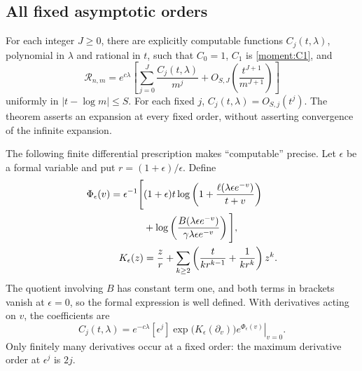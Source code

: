 \subsection{All fixed asymptotic orders}
\begin{theorem}
\label{moment:thm:all-orders}
For each integer $J\ge0$, there are explicitly computable functions
$C_j(t,\lambda)$, polynomial in $\lambda$ and rational in $t$, such that
$C_0=1$, $C_1$ is \eqref{moment:C1}, and
\begin{equation}\label{moment:all-orders}
 \mathcal R_{n,m}=e^{c\lambda}
 \left[\sum_{j=0}^J\frac{C_j(t,\lambda)}{m^j}
 +O_{S,J}\!\left(\frac{t^{J+1}}{m^{J+1}}\right)\right]
\end{equation}
uniformly in $|t-\log m|\le S$. For each fixed $j$,
$C_j(t,\lambda)=O_{S,j}(t^j)$. The theorem asserts an expansion at every
fixed order, without asserting convergence of the infinite expansion.
\end{theorem}

The following finite differential prescription makes ``computable''
precise. Let $\epsilon$ be a formal variable and put
$r=(1+\epsilon)/\epsilon$. Define
\begin{align}\label{moment:formal-Phi}
 \Phi_\epsilon(v)=\epsilon^{-1}\Bigg[
 &(1+\epsilon)t\log\left(1+
 \frac{\ell(\lambda\epsilon e^{-v})}{t+v}\right)\notag\\
 &+\log\left(\frac{B(\lambda\epsilon e^{-v})}
                        {\gamma\lambda\epsilon e^{-v}}\right)\Bigg],\\
 K_\epsilon(z)&=\frac zr+
 \sum_{k\ge2}\left(\frac{t}{kr^{k-1}}+
                         \frac1{kr^k}\right)z^k.
 \label{moment:formal-K}
\end{align}
The quotient involving $B$ has constant term one, and both terms in
brackets vanish at $\epsilon=0$, so the formal expression is well defined.
With derivatives acting on $v$, the coefficients are
\begin{equation}\label{moment:coefficient-algorithm}
 C_j(t,\lambda)=e^{-c\lambda}[\epsilon^j]
 \left.\exp\!\bigl(K_\epsilon(\partial_v)\bigr)
                      e^{\Phi_\epsilon(v)}\right|_{v=0}.
\end{equation}
Only finitely many derivatives occur at a fixed order: the maximum
derivative order at $\epsilon^j$ is $2j$.

